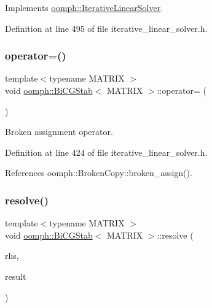Implements \hyperlink{classoomph_1_1IterativeLinearSolver_a5fe7f7b5e4847fdbd4f95d3875ec7a46}{oomph\+::\+Iterative\+Linear\+Solver}.



Definition at line 495 of file iterative\+\_\+linear\+\_\+solver.\+h.

\mbox{\label{classoomph_1_1BiCGStab_a3b99e41f431ac8775c1eafe9a67edf54}} 
\subsubsection{\texorpdfstring{operator=()}{operator=()}}
{\footnotesize\ttfamily template$<$typename M\+A\+T\+R\+IX $>$ \\
void \hyperlink{classoomph_1_1BiCGStab}{oomph\+::\+Bi\+C\+G\+Stab}$<$ M\+A\+T\+R\+IX $>$\+::operator= (\begin{DoxyParamCaption}\item[{const \hyperlink{classoomph_1_1BiCGStab}{Bi\+C\+G\+Stab}$<$ M\+A\+T\+R\+IX $>$ \&}]{ }\end{DoxyParamCaption})\hspace{0.3cm}{\ttfamily [inline]}}



Broken assignment operator. 



Definition at line 424 of file iterative\+\_\+linear\+\_\+solver.\+h.



References oomph\+::\+Broken\+Copy\+::broken\+\_\+assign().

\mbox{\label{classoomph_1_1BiCGStab_a3694a08628f3567caa5f20bb5dcfe677}} 
\subsubsection{\texorpdfstring{resolve()}{resolve()}}
{\footnotesize\ttfamily template$<$typename M\+A\+T\+R\+IX $>$ \\
void \hyperlink{classoomph_1_1BiCGStab}{oomph\+::\+Bi\+C\+G\+Stab}$<$ M\+A\+T\+R\+IX $>$\+::resolve (\begin{DoxyParamCaption}\item[{const \hyperlink{classoomph_1_1DoubleVector}{Double\+Vector} \&}]{rhs,  }\item[{\hyperlink{classoomph_1_1DoubleVector}{Double\+Vector} \&}]{result }\end{DoxyParamCaption})\hspace{0.3cm}{\ttfamily [virtual]}}



